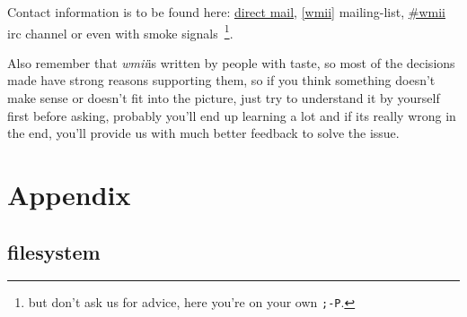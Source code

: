 \documentclass[12pt,a4paper]{article} %
\newcommand{\wmii}{\emph{wmii}}
\begin{document}
    Contact information is to be found here:
    \href{http://wmii.de/index.php/BeginnersGuide}{direct mail},
    \href{http://wmii.de/index.php/MailingList}{[wmii]} mailing-list,
    \href{http://wmii.de/index.php/IRC}{\#wmii} irc channel or even
    with smoke signals~\footnote{ but don't ask us for advice, here
      you're on your own \texttt{;-P}.}.

    Also remember that \wmii is written by people with taste, so most
    of the decisions made have strong reasons supporting them, so if
    you think something doesn't make sense or doesn't fit into the
    picture, just try to understand it by yourself first before
    asking, probably you'll end up learning a lot and if its really
    wrong in the end, you'll provide us with much better feedback to
    solve the issue.

    \newpage

    \section{Appendix}
    \label{sec:appendix}

    \subsection{filesystem}
\end{document}
